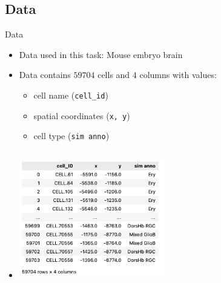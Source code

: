 \documentclass{beamer}
\begin{document}
\subsection{Data}
\begin{frame}{Data}

\begin{itemize}
    \item <1->Data used in this task: Mouse embryo brain
    \item<2-> Data contains $59704$ cells and $4$ columns with values:
    \begin{itemize}
        \item<3-> cell name (\texttt{cell\_id})
        \item<4-> spatial coordinates (\texttt{x, y})
        \item<5-> cell type (\texttt{sim anno}) 
    \end{itemize}
    \item<6-> []
    \begin{columns}
        \begin{column}{0.9\textwidth} %
          \includegraphics[width=0.5\textwidth]{dataCSV.png}
          \caption{Data in CSV format}
        \end{column}
    \end{columns}
        
\end{itemize}

\end{frame}
\end{document}
